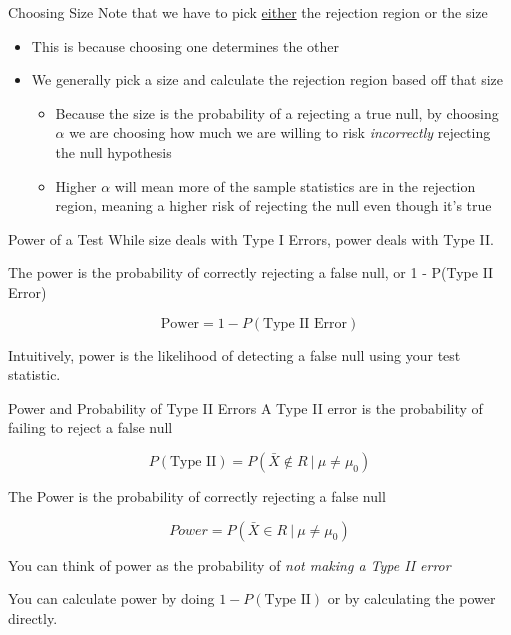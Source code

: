\documentclass{beamer}
\begin{document}
\begin{frame}{Choosing Size}
	Note that we have to pick \underline{either} the rejection region or the size
	\begin{itemize} 
		\item This is because choosing one determines the other
	\end{itemize}
	
	\begin{itemize}
		\item We generally pick a size and calculate the rejection region based off that size
		      \begin{itemize}
		      	\item Because the size is the probability of a rejecting a true null, by choosing $\alpha$ we are choosing how much we are willing to risk \textit{incorrectly} rejecting the null hypothesis
		      	
				\item Higher $\alpha$ will mean more of the sample statistics are in the rejection region, meaning a higher risk of rejecting the null even though it's true 
		      \end{itemize}
	\end{itemize}
\end{frame}

\begin{frame}{Power of a Test}
	While size deals with Type I Errors, power deals with Type II.

	\begin{definition}[Power]
		\vspace{5mm}
		The \alert{power} is the probability of correctly rejecting a false null, or 1 - P(Type II Error)
		
		\[ \text{Power} = 1 - P(\text{Type II Error}) \]
	\end{definition}

	Intuitively, power is the likelihood of detecting a false null using your test statistic.
\end{frame}

\begin{frame}{Power and Probability of Type II Errors}
	A Type II error is the probability of failing to reject a false null

	$$P(\text{Type II})=P(\bar{X} \notin R \ \vert \ \mu \neq \mu_0)$$
	
	The \alert{Power} is the probability of correctly rejecting a false null

	$$Power=P(\bar{X} \in R \ \vert \ \mu \neq \mu_0)$$
	
	You can think of power as the probability of \textit{not making a Type II error}
	
	You can calculate power by doing $1 - P(\text{Type II})$ or by calculating the power directly.
\end{frame}
\end{document}
